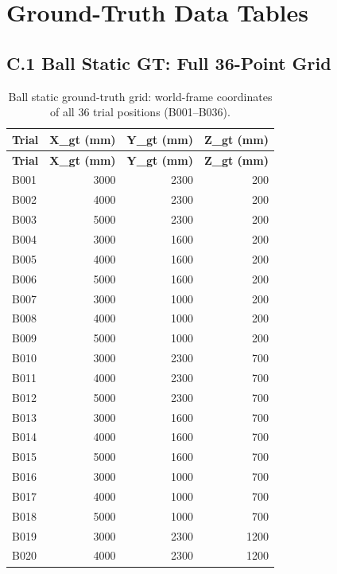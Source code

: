 \cleardoublepage
{}
\chapter{Ground-Truth Data Tables}

\section*{C.1 Ball Static GT: Full 36-Point Grid}

{\small
\setlength{\LTleft}{0pt}
\setlength{\LTright}{0pt}
\begin{longtable}{|l|r|r|r|}
\caption{Ball static ground-truth grid: world-frame coordinates of all 36 trial positions (B001--B036).}
\label{tab:app_c_ball_grid}\\
\hline
\textbf{Trial} & \textbf{X\_gt (mm)} & \textbf{Y\_gt (mm)} & \textbf{Z\_gt (mm)} \\
\hline
\endfirsthead
\textbf{Trial} & \textbf{X\_gt (mm)} & \textbf{Y\_gt (mm)} & \textbf{Z\_gt (mm)} \\
\hline
\endhead
B001 & 3000 & 2300 & 200 \\
\hline
B002 & 4000 & 2300 & 200 \\
\hline
B003 & 5000 & 2300 & 200 \\
\hline
B004 & 3000 & 1600 & 200 \\
\hline
B005 & 4000 & 1600 & 200 \\
\hline
B006 & 5000 & 1600 & 200 \\
\hline
B007 & 3000 & 1000 & 200 \\
\hline
B008 & 4000 & 1000 & 200 \\
\hline
B009 & 5000 & 1000 & 200 \\
\hline
B010 & 3000 & 2300 & 700 \\
\hline
B011 & 4000 & 2300 & 700 \\
\hline
B012 & 5000 & 2300 & 700 \\
\hline
B013 & 3000 & 1600 & 700 \\
\hline
B014 & 4000 & 1600 & 700 \\
\hline
B015 & 5000 & 1600 & 700 \\
\hline
B016 & 3000 & 1000 & 700 \\
\hline
B017 & 4000 & 1000 & 700 \\
\hline
B018 & 5000 & 1000 & 700 \\
\hline
B019 & 3000 & 2300 & 1200 \\
\hline
B020 & 4000 & 2300 & 1200 \\

\end{longtable}}
